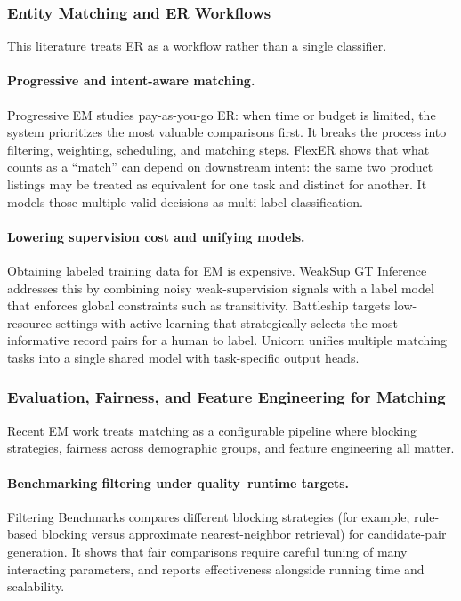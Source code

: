 \documentclass[sigconf]{acmart}
\begin{document}
\subsubsection{Entity Matching and ER Workflows}

This literature treats ER as a workflow rather than a single classifier.

\paragraph{Progressive and intent-aware matching.}
Progressive EM studies pay-as-you-go ER: when time or budget is limited, the system prioritizes the most valuable comparisons first. It breaks the process into filtering, weighting, scheduling, and matching steps. FlexER shows that what counts as a ``match'' can depend on downstream intent: the same two product listings may be treated as equivalent for one task and distinct for another. It models those multiple valid decisions as multi-label classification.

\paragraph{Lowering supervision cost and unifying models.}
Obtaining labeled training data for EM is expensive. WeakSup GT Inference addresses this by combining noisy weak-supervision signals with a label model that enforces global constraints such as transitivity. Battleship targets low-resource settings with active learning that strategically selects the most informative record pairs for a human to label. Unicorn unifies multiple matching tasks into a single shared model with task-specific output heads.


\subsubsection{Evaluation, Fairness, and Feature Engineering for Matching}

Recent EM work treats matching as a configurable pipeline where blocking strategies, fairness across demographic groups, and feature engineering all matter.

\paragraph{Benchmarking filtering under quality--runtime targets.}
Filtering Benchmarks compares different blocking strategies (for example, rule-based blocking versus approximate nearest-neighbor retrieval) for candidate-pair generation. It shows that fair comparisons require careful tuning of many interacting parameters, and reports effectiveness alongside running time and scalability.
\end{document}
